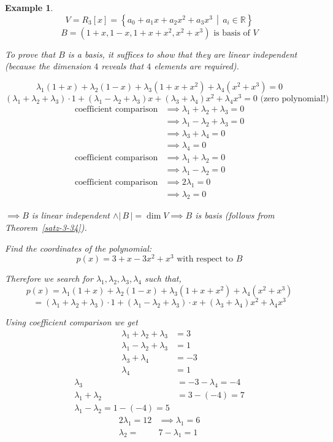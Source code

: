 \documentclass[a4paper,landscape,twocolumn]{article}
\newcommand\setdef[2]{\left\{#1\,\middle|\,#2\right\}}
\newcommand\card[1]{\left|\,#1\,\right|}
\newtheorem{ex}{Example}[section]
\begin{document}
\begin{ex}
  \[ V = R_3[x] = \setdef{a_0 + a_1 x + a_2 x^2 + a_3 x^3}{a_i \in \mathbb R} \]
  \[ B = (1 + x, 1 - x, 1 + x + x^2, x^2 + x^3) \text{ is basis of } V \]

  To prove that $B$ is a basis, it suffices to show that they are linear independent (because the dimension $4$ reveals that $4$ elements are required).

  \[ \lambda_1 (1+x) + \lambda_2 (1-x) + \lambda_3(1+x+x^2) + \lambda_4(x^2+x^3) = 0 \]
  \[ (\lambda_1 + \lambda_2 + \lambda_3) \cdot 1 + (\lambda_1 - \lambda_2 + \lambda_3) x + (\lambda_3 + \lambda_4) x^2 + \lambda_4 x^3 = 0 \text{ (zero polynomial!)} \]
  \begin{align*}
    \text{coefficient comparison} &\implies \lambda_1 + \lambda_2 + \lambda_3 = 0 \\
      &\implies \lambda_1 - \lambda_2 + \lambda_3 = 0 \\
      &\implies \lambda_3 + \lambda_4 = 0 \\
      &\implies \lambda_4 = 0 \\
    \text{coefficient comparison} &\implies \lambda_1 + \lambda_2 = 0 \\
      &\implies \lambda_1 - \lambda_2 = 0 \\
    \text{coefficient comparison} &\implies 2 \lambda_1 = 0 \\
      &\implies \lambda_2 = 0
  \end{align*}

  $\implies B$ is linear independent $\land \card{B} = \dim{V} \implies B$ is basis (follows from Theorem~\ref{satz-3-34}).

  Find the coordinates of the polynomial:
  \[ p(x) = 3 + x - 3x^2 + x^3 \text{ with respect to } B \]

  Therefore we search for $\lambda_1, \lambda_2, \lambda_3, \lambda_4$ such that,
  \[ p(x) = \lambda_1 (1 + x) + \lambda_2 (1 - x) + \lambda_3 (1 + x + x^2) + \lambda_4 (x^2 + x^3) \]
  \[ = (\lambda_1 + \lambda_2 + \lambda_3) \cdot 1 + (\lambda_1 - \lambda_2 + \lambda_3) \cdot x + (\lambda_3 + \lambda_4) x^2 + \lambda_4 x^3 \]

  Using coefficient comparison we get
  \begin{align*}
    \lambda_1 + \lambda_2 + \lambda_3 &= 3 \\
    \lambda_1 - \lambda_2 + \lambda_3 &= 1 \\
                \lambda_3 + \lambda_4 &= -3 \\
                            \lambda_4 &= 1
  \end{align*}
  \begin{align*}
    \lambda_3 &= -3 - \lambda_4 = -4 \\
    \lambda_1 + \lambda_2 &= 3 - (-4) = 7 \\
    \lambda_1 - \lambda_2 = 1 - (-4) = 5
  \end{align*}
  \begin{align*}
    2\lambda_1 = 12 &\implies \lambda_1 = 6 \\
    \lambda_2 = &7 - \lambda_1 = 1
  \end{align*}


\end{ex}
\end{document}
